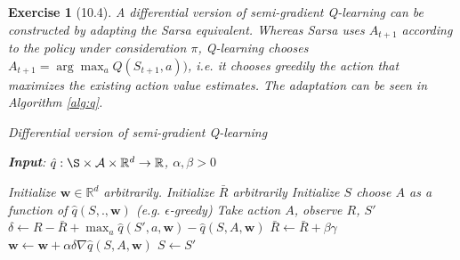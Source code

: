 \documentclass[a4paper]{scrartcl}
\theoremstyle{nonumberplain}
\newtheorem{ex}{Exercise}
\begin{document}
\begin{ex}[10.4]

A differential version of semi-gradient Q-learning can be constructed by adapting the Sarsa equivalent. Whereas Sarsa uses $A_{t+1}$ according to the policy under consideration $\pi$, Q-learning chooses $A_{t+1}=\arg\max_a Q(S_{t+1}, a))$, i.e. it chooses greedily the action that maximizes the existing action value estimates. The adaptation can be seen in Algorithm \autoref{alg:q}.

\begin{algorithm}[H]
	\caption{Differential version of semi-gradient Q-learning}
	\label{alg:q}
	\textbf{Input}: $\hat{q}: \S \times \mathcal{A} \times \mathbb{R}^d \rightarrow \mathbb{R}$, $\alpha, \beta > 0$
	
	\begin{algorithmic}
		\State Initialize $\mathbf{w} \in \mathbb{R}^d$ arbitrarily.
		\State Initialize $\bar{R}$ arbitrarily
		\State Initialize $S$
		\State choose $A$ as a function of $\hat{q}(S, ., \mathbf{w})$ (e.g. $\epsilon$-greedy)
		\State Take action $A$, observe $R$, $S'$
		\State $\delta \gets R - \bar{R} + \max_a \hat{q}(S',a,\mathbf{w}) - \hat{q}(S,A,\mathbf{w})$
		\State $\bar{R} \gets \bar{R} + \beta \gamma$
		\State $\mathbf{w} \gets \mathbf{w} + \alpha \delta \nabla \hat{q}(S,A,\mathbf{w})$
		\State $S \gets S'$
		\EndWhile
	\end{algorithmic}
\end{algorithm}

\end{ex}
\end{document}
